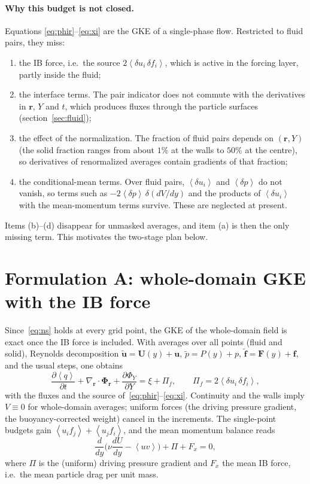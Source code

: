 \documentclass[11pt,a4paper]{article}
\newcommand{\avg}[1]{\left\langle #1 \right\rangle}
\newcommand{\du}{\delta u}
\newcommand{\vect}[1]{\boldsymbol{#1}}
\begin{document}
\paragraph{Why this budget is not closed.} Equations
\eqref{eq:phir}--\eqref{eq:xi} are the GKE of a single-phase flow. Restricted
to fluid pairs, they miss:
\begin{enumerate}[label=(\alph*),itemsep=1pt]
\item the IB force, i.e.\ the source $2\avg{\du_i\,\delta f_i}$, which is
  active in the forcing layer, partly inside the fluid;
\item the interface terms. The pair indicator does not commute with the
  derivatives in $\vect r$, $Y$ and $t$, which produces fluxes through the
  particle surfaces (section~\ref{sec:fluid});
\item the effect of the normalization. The fraction of fluid pairs depends on
  $(\vect r,Y)$ (the solid fraction ranges from about $1\%$ at the walls to
  $50\%$ at the centre), so derivatives of renormalized averages contain
  gradients of that fraction;
\item the conditional-mean terms. Over fluid pairs, $\avg{\du_i}$ and
  $\avg{\delta p}$ do not vanish, so terms such as
  $-2\avg{\delta p}\,\delta(dV/dy)$ and the products of $\avg{\du_i}$ with
  the mean-momentum terms survive. These are neglected at present.
\end{enumerate}
Items (b)--(d) disappear for unmasked averages, and item (a) is then the only
missing term. This motivates the two-stage plan below.

\section{Formulation A: whole-domain GKE with the IB force}
\label{sec:whole}

Since~\eqref{eq:ns} holds at every grid point, the GKE of the whole-domain
field is exact once the IB force is included. With averages over all points
(fluid and solid), Reynolds decomposition
$\tilde{\vect u}=\vect U(y)+\vect u$, $\tilde p=P(y)+p$,
$\tilde{\vect f}=\vect F(y)+\vect f$, and the usual steps, one obtains
\begin{equation}
  \frac{\partial\avg{q}}{\partial t}+\nabla_{\vect r}\cdot\vect\Phi_{\vect r}
  +\frac{\partial\Phi_Y}{\partial Y}=\xi+\Pi_f,\qquad
  \Pi_f=2\avg{\du_i\,\delta f_i},
  \label{eq:gkef}
\end{equation}
with the fluxes and the source of~\eqref{eq:phir}--\eqref{eq:xi}. Continuity
and the walls imply $V\equiv0$ for whole-domain averages; uniform forces (the
driving pressure gradient, the buoyancy-corrected weight) cancel in the
increments. The single-point budgets gain
$\avg{u_if_j}+\avg{u_jf_i}$, and the mean momentum balance reads
\begin{equation}
  \frac{d}{dy}\Big(\nu\frac{dU}{dy}-\avg{uv}\Big)+\Pi+F_x=0,
  \label{eq:mean}
\end{equation}
where $\Pi$ is the (uniform) driving pressure gradient and $F_x$ the mean IB
force, i.e.\ the mean particle drag per unit mass.
\end{document}
